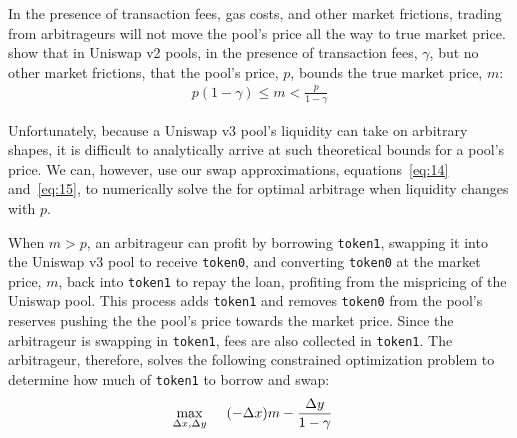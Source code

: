 \documentclass[11pt]{article}
\begin{document}
In the presence of transaction fees, gas costs, and other market frictions, trading from arbitrageurs will not move the pool's price all the way to true market price. \citet{angeris2021analysis} show that in Uniswap v2 pools, in the presence of transaction fees, $\gamma$, but no other market frictions, that the pool's price, $p$, bounds the true market price, $m$:
\begin{gather*}
    p (1 - \gamma) \le m < \frac{p}{1 - \gamma}
\end{gather*}

Unfortunately, because a Uniswap v3 pool's liquidity can take on arbitrary shapes, it is difficult to analytically arrive at such theoretical bounds for a pool's price. We can, however, use our swap approximations, equations~\eqref{eq:14} and~\eqref{eq:15}, to numerically solve the for optimal arbitrage when liquidity changes with $p$.

When $m > p$, an arbitrageur can profit by borrowing \texttt{token1}, swapping it into the Uniswap v3 pool to receive \texttt{token0}, and converting \texttt{token0} at the market price, $m$, back into \texttt{token1} to repay the loan, profiting from the mispricing of the Uniswap pool. This process adds \texttt{token1} and removes \texttt{token0} from the pool's reserves pushing the the pool's price towards the market price. Since the arbitrageur is swapping in \texttt{token1}, fees are also collected in \texttt{token1}. The arbitrageur, therefore, solves the following constrained optimization problem to determine how much of \texttt{token1} to borrow and swap:
\begin{align*}
    \max_{\Delta x, \Delta y} \hspace{0.5cm} &(-\Delta x) m - \frac{\Delta y}{1 - \gamma}
\end{align*}
\end{document}
